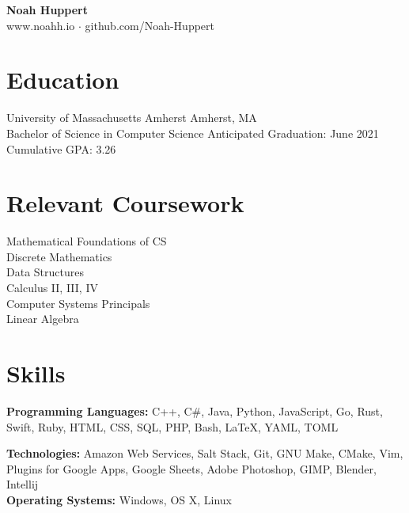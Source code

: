 \documentclass[10pt]{article}
\begin{document}

\centering
	\textbf{Noah Huppert} \\
	
	www.noahh.io $\cdot$ github.com/Noah-Huppert


\begin{flushleft}

\section{Education}
	University of Massachusetts Amherst \hfill Amherst, MA \\
	Bachelor of Science in Computer Science \hfill Anticipated Graduation: June 2021 \\
	Cumulative GPA: 3.26

\section{Relevant Coursework}
	\begin{addmargin}[1em]{1em}
	\begin{multicols}{3}
		Mathematical Foundations of CS \\
		Discrete Mathematics \\

		Data Structures \\
		Calculus II, III, IV \\

		Computer Systems Principals \\
		Linear Algebra 
	\end{multicols} 
	\end{addmargin}


\section{Skills}
	\textbf{Programming Languages:} C++, C\#, Java, Python, JavaScript, Go, Rust, Swift, Ruby, HTML, CSS, SQL, PHP,
		Bash, LaTeX, YAML, TOML

	\textbf{Technologies:} Amazon Web Services, Salt Stack, Git, GNU Make, CMake, Vim, Plugins for Google Apps,
		Google Sheets, Adobe Photoshop, GIMP, Blender, Intellij \\

	\textbf{Operating Systems:} Windows, OS X, Linux


\end{flushleft}
\end{document}
